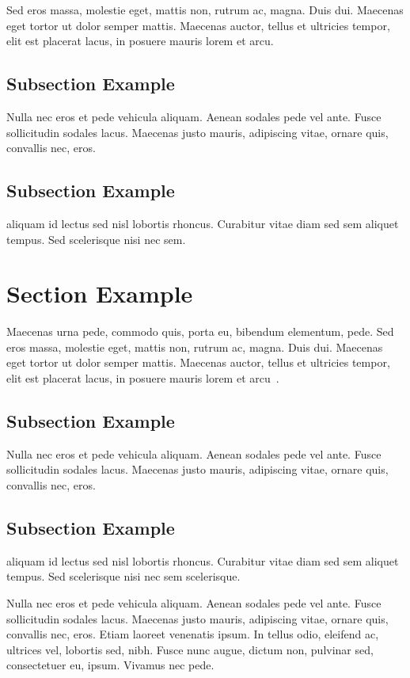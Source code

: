 Sed eros massa, molestie eget, mattis non, rutrum ac, magna. 
Duis dui. Maecenas eget tortor ut dolor semper mattis. 
Maecenas auctor, tellus et ultricies tempor, elit
est placerat lacus, in posuere mauris lorem et arcu. 

\subsection{Subsection Example}

Nulla nec eros et pede vehicula aliquam. Aenean sodales pede vel
ante. Fusce sollicitudin sodales lacus. Maecenas justo mauris,
adipiscing vitae, ornare quis, convallis nec, eros. 

\subsection{Subsection Example}

\textcite{khakipoor_linear_2023,liu_energy_2023} aliquam id lectus sed nisl lobortis rhoncus. 
Curabitur vitae diam sed sem aliquet tempus. Sed scelerisque 
nisi nec sem.

\section{Section Example}

Maecenas urna pede, commodo quis, porta eu, bibendum elementum, 
pede. Sed eros massa, molestie eget, mattis non, rutrum ac, 
magna. Duis dui. Maecenas eget tortor ut dolor semper mattis. 
Maecenas auctor, tellus et ultricies tempor, elit est placerat 
lacus, in posuere mauris lorem et arcu~\parencite{monopoli_exploiting_2023,zhang_carma_2023,chang_adas_2023, guo_rapidstream_2023}. 

\subsection{Subsection Example}

Nulla nec eros et pede vehicula aliquam. Aenean sodales pede vel
ante. Fusce sollicitudin sodales lacus. Maecenas justo mauris,
adipiscing vitae, ornare quis, convallis nec, eros. 

\subsection{Subsection Example}

\textcite{khakipoor_linear_2023,liu_energy_2023} aliquam id lectus sed nisl lobortis rhoncus. 
Curabitur vitae diam sed sem aliquet tempus. Sed scelerisque 
nisi nec sem scelerisque.

Nulla nec eros et pede vehicula aliquam. Aenean sodales pede vel
ante. Fusce sollicitudin sodales lacus. Maecenas justo mauris,
adipiscing vitae, ornare quis, convallis nec, eros. Etiam laoreet
venenatis ipsum. In tellus odio, eleifend ac, ultrices vel, lobortis
sed, nibh. Fusce nunc augue, dictum non, pulvinar sed, consectetuer
eu, ipsum. Vivamus nec pede.  

